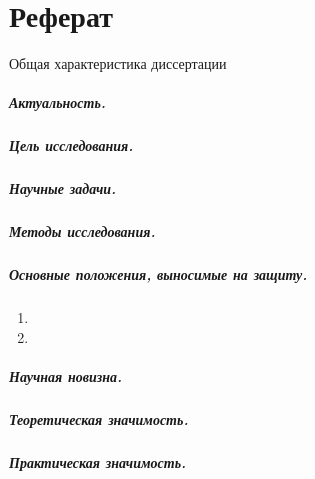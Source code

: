 \chapter*{Реферат}

\begin{center}
    Общая характеристика диссертации
\end{center}



\paragraph*{Актуальность.}

\paragraph*{Цель исследования.}

\paragraph*{Научные задачи.}

\paragraph*{Методы исследования.}


\paragraph*{Основные положения, выносимые на защиту.}
\begin{enumerate}
    \item \statementOneRU
    \item \statementTwoRU
\end{enumerate}

\paragraph*{Научная новизна.}

\paragraph*{Теоретическая значимость.}
\paragraph*{Практическая значимость.}
